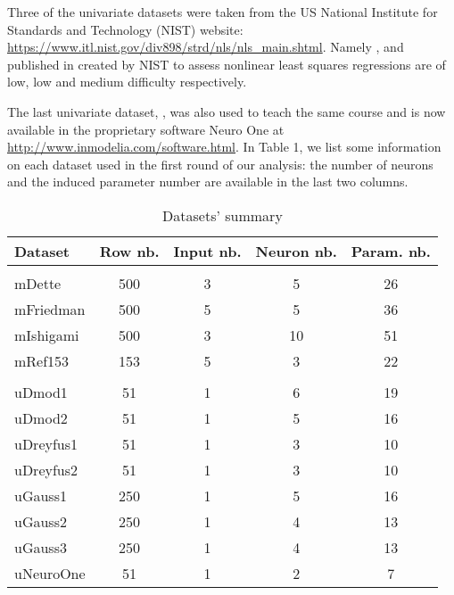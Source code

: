Three of the univariate datasets were taken from the US National
Institute for Standards and Technology (NIST) website:
\url{https://www.itl.nist.gov/div898/strd/nls/nls_main.shtml}. Namely
,  and  published in
\citep[resp.]{rustnist96:Gauss1,rustnist96:Gauss2,rustnist96:Gauss3}
created by NIST to assess nonlinear least squares regressions are of
low, low and medium difficulty respectively.

The last univariate dataset, , was also used to teach
the same course and is now available in the proprietary software Neuro
One at \url{http://www.inmodelia.com/software.html}. In Table 1, we list
some information on each dataset used in the first round of our
analysis: the number of neurons and the induced parameter number are
available in the last two columns.

\begin{Schunk}
\begin{table}

\caption{\label{tab:unnamed-chunk-2}Datasets' summary}
\centering
\fontsize{7}{9}\selectfont
\begin{tabular}[t]{lcccc}
\toprule
Dataset & Row nb. & Input nb. & Neuron nb. & Param. nb.\\
\midrule
\addlinespace[0.3em]
\multicolumn{5}{l}{\textbf{Multivariate}}\\
\hspace{1em}mDette & 500 & 3 & 5 & 26\\
\hspace{1em}mFriedman & 500 & 5 & 5 & 36\\
\hspace{1em}mIshigami & 500 & 3 & 10 & 51\\
\hspace{1em}mRef153 & 153 & 5 & 3 & 22\\
\addlinespace[0.3em]
\multicolumn{5}{l}{\textbf{Univariate}}\\
\hspace{1em}uDmod1 & 51 & 1 & 6 & 19\\
\hspace{1em}uDmod2 & 51 & 1 & 5 & 16\\
\hspace{1em}uDreyfus1 & 51 & 1 & 3 & 10\\
\hspace{1em}uDreyfus2 & 51 & 1 & 3 & 10\\
\hspace{1em}uGauss1 & 250 & 1 & 5 & 16\\
\hspace{1em}uGauss2 & 250 & 1 & 4 & 13\\
\hspace{1em}uGauss3 & 250 & 1 & 4 & 13\\
\hspace{1em}uNeuroOne & 51 & 1 & 2 & 7\\
\bottomrule
\end{tabular}
\end{table}

\end{Schunk}

